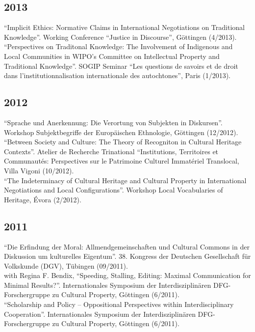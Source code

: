 \documentclass[11pt, a4paper]{article} %
\begin{document}
\subsection*{2013}
\enquote{Implicit Ethics: Normative Claims in International Negotiations on Traditional Knowledge}. Working Conference “Justice in Discourse”, Göttingen (4/2013).\\[.25cm]
\enquote{Perspectives on Traditonal Knowledge: The Involvement of Indigenous and Local Communities in WIPO’s Committee on Intellectual Property and Traditional Knowledge}. SOGIP Seminar “Les questions de savoirs et de droit dans l’institutionnalisation internationale des autochtones”, Paris (1/2013).
\subsection*{2012}
\enquote{Sprache und Anerkennung: Die Verortung von Subjekten in Diskursen}. Workshop Subjektbegriffe der Europäischen Ethnologie, Göttingen (12/2012).\\[.25cm]
\enquote{Between Society and Culture: The Theory of Recogniton in Cultural Heritage Contexts}. Atelier de Recherche Trinational “Institutions, Territoires et Communautés: Perspectives sur le Patrimoine Culturel Immatériel Translocal, Villa Vigoni (10/2012).\\[.25cm]
\enquote{The Indeterminacy of Cultural Heritage and Cultural Property in International Negotiations and Local Configurations}. Workshop Local Vocabularies of Heritage, Évora (2/2012).
\subsection*{2011}
\enquote{Die Erfindung der Moral: Allmendgemeinschaften und Cultural Commons in der Diskussion um kulturelles Eigentum}. 38. Kongress der Deutschen Gesellschaft für Volkskunde (DGV), Tübingen (09/2011).\\[.25cm]
with Regina F. Bendix, \enquote{Speeding, Stalling, Editing: Maximal Communication for Minimal Results?}. Internationales Symposium der Interdisziplinären DFG-Forschergruppe zu Cultural Property, Göttingen (6/2011).\\[.25cm]
\enquote{Scholarship and Policy – Oppositional Perspectives within Interdisciplinary Cooperation}. Internationales Symposium der Interdisziplinären DFG-Forschergruppe zu Cultural Property, Göttingen (6/2011).
\end{document}
